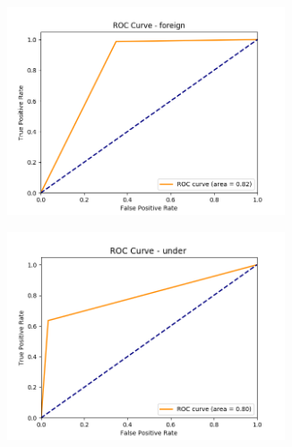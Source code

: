 \documentclass[fleqn,twoside,12pt]{report}
\begin{document}
\begin{figure}[ht]
	\centering
	\begin{subfigure}{0.5\linewidth}
		\centering
		\includegraphics[width=0.9\textwidth]{ROC_foreign.png}
		\caption{}
		\label{fig:ROC_f}
	\end{subfigure}%
	\begin{subfigure}{0.5\linewidth}
		\centering
		\includegraphics[width=0.9\textwidth]{ROC_under.png}
		\caption{}
		\label{fig:ROC_u}
	\end{subfigure}%
	

\end{figure}
\end{document}
